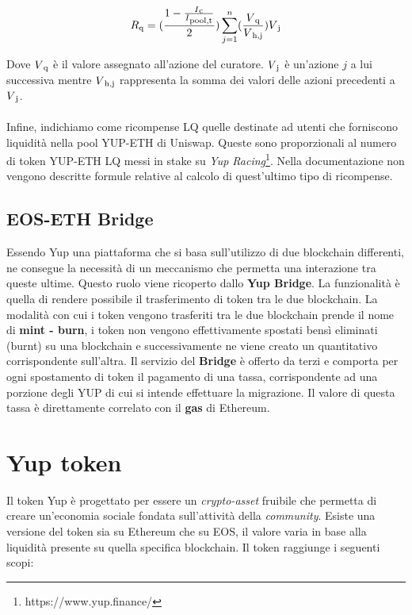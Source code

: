 \begin{equation}\label{eq: curator_reward}
   R\textsubscript{q} = (\frac{1 - \frac{I\textsubscript{c}}{I\textsubscript{pool,t}}}{2}) \sum\limits_{j=1}^n (\frac{V\textsubscript{q}}{V\textsubscript{h,j}}) V\textsubscript{j}
\end{equation}


Dove $V\textsubscript{q}$ è il valore assegnato all'azione del curatore. $V\textsubscript{j}$ è un'azione $j$ a lui successiva mentre $V\textsubscript{h,j}$ rappresenta la somma dei valori delle azioni precedenti a $V\textsubscript{j}$.
\\
\\
Infine, indichiamo come ricompense LQ quelle destinate ad utenti che forniscono liquidità nella pool YUP-ETH di Uniswap. Queste sono proporzionali al numero di token YUP-ETH LQ messi in stake su \textit{Yup Racing}\footnote{https://www.yup.finance/}. Nella documentazione non vengono descritte formule relative al calcolo di quest'ultimo tipo di ricompense.

\subsection{EOS-ETH Bridge}
Essendo Yup una piattaforma che si basa sull'utilizzo di due blockchain differenti, ne consegue la necessità di un meccanismo che permetta una interazione tra queste ultime. Questo ruolo viene ricoperto dallo \textbf{Yup Bridge}. La funzionalità è quella di rendere possibile il trasferimento di token tra le due blockchain. La modalità con cui i token vengono trasferiti tra le due blockchain prende il nome di \textbf{mint - burn}, i token non vengono effettivamente spostati bensì eliminati (burnt) su una blockchain e successivamente ne viene creato un quantitativo corrispondente sull'altra. Il servizio del \textbf{Bridge} è offerto da terzi e comporta per ogni spostamento di token il pagamento di una tassa, corrispondente ad una porzione degli YUP di cui si intende effettuare la migrazione. Il valore di questa tassa è direttamente correlato con il \textbf{gas} di Ethereum.

\section{Yup token}
Il token Yup è progettato per essere un \textit{crypto-asset} fruibile che permetta di creare un'economia sociale fondata sull'attività della \textit{community}. Esiste una versione del token sia su Ethereum che su EOS, il valore varia in base alla liquidità presente su quella specifica blockchain. 
Il token raggiunge i seguenti scopi:

